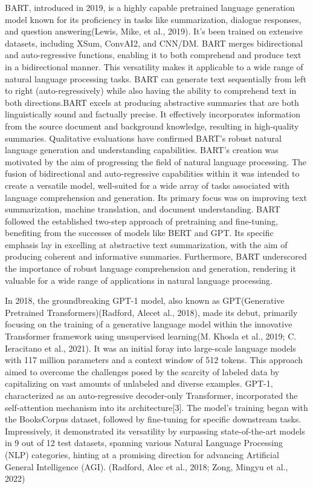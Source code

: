 \documentclass[fleqn,10pt]{thescipub} %
\begin{document}
BART, introduced in 2019, is a highly capable pretrained language generation model known for its proficiency in tasks like summarization, dialogue responses, and question answering(Lewis, Mike, et al., 2019). It's been trained on extensive datasets, including XSum, ConvAI2, and CNN/DM. BART merges bidirectional and auto-regressive functions, enabling it to both comprehend and produce text in a bidirectional manner. This versatility makes it applicable to a wide range of natural language processing tasks. BART can generate text sequentially from left to right (auto-regressively) while also having the ability to comprehend text in both directions.BART excels at producing abstractive summaries that are both linguistically sound and factually precise. It effectively incorporates information from the source document and background knowledge, resulting in high-quality summaries. Qualitative evaluations have confirmed BART's robust natural language generation and understanding capabilities.
BART's creation was motivated by the aim of progressing the field of natural language processing. The fusion of bidirectional and auto-regressive capabilities within it was intended to create a versatile model, well-suited for a wide array of tasks associated with language comprehension and generation. Its primary focus was on improving text summarization, machine translation, and document understanding. BART followed the established two-step approach of pretraining and fine-tuning, benefiting from the successes of models like BERT and GPT. Its specific emphasis lay in excelling at abstractive text summarization, with the aim of producing coherent and informative summaries. Furthermore, BART underscored the importance of robust language comprehension and generation, rendering it valuable for a wide range of applications in natural language processing.



In 2018, the groundbreaking GPT-1 model, also known as GPT(Generative Pretrained Transformers)(Radford, Alecet al., 2018), made its debut, primarily focusing on the training of a generative language model within the innovative Transformer framework using unsupervised learning(M. Khosla et al., 2019; C. Ieracitano et al., 2021). It was an initial foray into large-scale language models with 117 million parameters and a context window of 512 tokens. This approach aimed to overcome the challenges posed by the scarcity of labeled data by capitalizing on vast amounts of unlabeled and diverse examples. GPT-1, characterized as an auto-regressive decoder-only Transformer, incorporated the self-attention mechanism into its architecture[3]. The model's training began with the BooksCorpus dataset, followed by fine-tuning for specific downstream tasks. Impressively, it demonstrated its versatility by surpassing state-of-the-art models in 9 out of 12 test datasets, spanning various Natural Language Processing (NLP) categories, hinting at a promising direction for advancing Artificial General Intelligence (AGI). (Radford, Alec et al., 2018; Zong, Mingyu et al., 2022)
\end{document}
